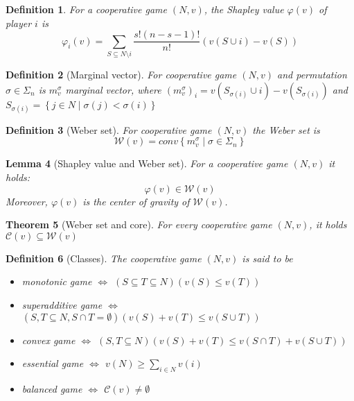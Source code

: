\documentclass[12pt]{report}
\newcounter{theorem}
\newtheorem{definition}[theorem]{Definition}
\newtheorem{theorem}{Theorem}
\newtheorem{lemma}[theorem]{Lemma}
\def\phi{\varphi}
\begin{document}
\begin{definition}
  For a cooperative game $(N,v)$, the Shapley value $\phi(v)$ of player $i$ is
  \[
    \phi_i(v) = \sum_{S \subseteq N \setminus i}\frac{s!(n-s-1)!}{n!}\left(v(S \cup i) - v(S)\right)
  \]
\end{definition}

\begin{definition}[Marginal vector]
  For cooperative game $(N,v)$ and permutation $\sigma \in \Sigma_n$ is $m_v^\sigma$ marginal vector, where $\left(m_v^\sigma\right)_i = v\left(S_{\sigma(i)}\cup i\right)-v\left(S_{\sigma(i)}\right)$ and $S_{\sigma(i)}= \left\{j \in N \mid \sigma(j) < \sigma(i)\right\}$
\end{definition}

\begin{definition}[Weber set]
  For cooperative game $(N,v)$ the Weber set is
  \[
    \mathcal{W}(v)=conv\left\{m^{\sigma}_{v}\mid \sigma \in \Sigma_n\right\}
  \]
\end{definition}

\begin{lemma}[Shapley value and Weber set]
  For a cooperative game $(N,v)$ it holds:
	\[
    \phi(v) \in \mathcal{W}(v)
  \]
	Moreover, $\phi(v)$ is the center of gravity of $\mathcal{W}(v)$.
\end{lemma}

\begin{theorem}[Weber set and core]
  For every cooperative game $(N,v)$, it holds $\mathcal{C}(v) \subseteq \mathcal{W}(v)$
\end{theorem}

\begin{definition}[Classes]
  The cooperative game $(N,v)$ is said to be
  \begin{itemize}
    \item monotonic game $\iff$ $\left(S \subseteq T \subseteq N\right)\left(v(S) \leq v(T)\right)$
		\item superadditive game $\iff$ $\left(S,T \subseteq N, S \cap T = \emptyset\right)\left(v(S)+v(T) \leq v\left(S \cup T\right)\right)$
		\item convex game $\iff$ $\left(S,T \subseteq N\right)\left(v(S)+v(T) \leq v\left(S \cap T\right)+v\left(S \cup T\right)\right)$
		\item essential game $\iff$ $v(N) \geq \sum_{i \in N} v(i)$
		\item balanced game $\iff$ $\mathcal{C}(v) \neq \emptyset$
  \end{itemize}
\end{definition}
\end{document}
